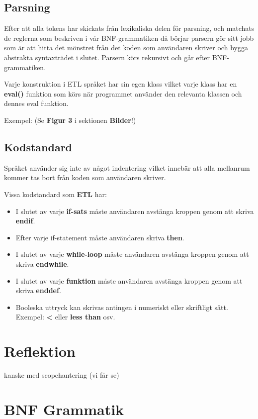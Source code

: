 \documentclass{TDP019mall}
\begin{document}
\newpage
\subsection{Parsning}
Efter att alla tokens har skickats från lexikaliska delen för parsning, och matchats de reglerna som beskriven i vår 
BNF-grammatiken då börjar parsern gör sitt jobb som är att hitta det mönstret från det koden som användaren skriver och bygga abstrakta 
syntaxträdet i slutet. Parsern körs rekursivt och går efter BNF-grammatiken. 

Varje konstruktion i ETL språket har sin egen klass vilket varje klass har en \textbf{eval()} funktion som körs när programmet använder
 den relevanta klassen och dennes eval funktion. 
 
Exempel: (Se \textbf{Figur 3} i sektionen \textbf{Bilder}!)


\subsection{Kodstandard}
Språket använder sig inte av något indentering vilket innebär att alla mellanrum kommer tas bort från koden som användaren skriver. 

Vissa kodstandard som \textbf{ETL} har:
\begin{itemize}
\item I slutet av varje \textbf{if-sats} måste användaren avstänga kroppen genom att skriva \textbf{endif}.
\item Efter varje if-statement måste användaren skriva \textbf{then}.
\item I slutet av varje \textbf{while-loop} måste användaren avstänga kroppen genom att skriva \textbf{endwhile}.
\item I slutet av varje \textbf{funktion} måste användaren avstänga kroppen genom att skriva \textbf{enddef}.
\item Booleska uttryck kan skrivas antingen i numeriskt eller skriftligt sätt. Exempel: \textbf{<} eller \textbf{less than} osv.
\end{itemize}


\section{Reflektion}
kanske med scopehantering (vi får se)


\section{BNF Grammatik}

\end{document}
